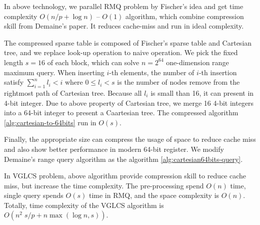 In above technology, we parallel RMQ problem by Fischer's idea and get
time complexity $O(n / p + \log n)$ -- $O(1)$ algorithm, which combine
compression skill from Demaine's paper. It reduces cache-miss and run in
ideal complexity.

\iffalse
在上述的技術中，我們可以藉由 Fischer 提出的方案平行化 RMQ 至 $O(n / p + \log n)$ -- $O(1)$，使用 Demaine 提供的技巧壓縮空間使用量，降低快取未中以提升運行效能。這裡我們挑選固定長度的壓縮方案 $s = 16$，其能解決序列長度為 $n = 2^{64}$ 的區間查找，將 16 個整數壓縮成一棵笛卡爾樹。在第 $i$ 次插入時，左旋的次數 $l_i$，每次操作皆符合 $\sum_{i=1}^{n} l_i < i$。
\fi

The compressed sparse table is composed of Fischer's sparse table and
Cartesian tree, and we replace look-up operation to naive operation.  We
pick the fixed length $s = 16$ of each block, which can solve $n =
2^{64}$ one-dimension range maximum query.  When inserting $i$-th
elements, the number of $i$-th insertion satisfy $\sum_{i=1}^{n} l_i <
i$ where $0 \le l_i < s$ is the number of nodes remove from the
rightmost path of Cartesian tree.  Because all $l_i$ is small than 16,
it can present in 4-bit integer.  Due to above property of Cartesian
tree, we merge 16 4-bit integers into a 64-bit integer to present a
Caartesian tree. The compressed algorithm \ref{alg:cartesian-to-64bits}
run in $O(s)$.




Finally, the appropriate size can compress the usage of space to
reduce cache miss and also show better performance in modern 64-bit
register.  We modify Demaine's range query algorithm as the algorithm
\ref{alg:cartesian64bits-query}.



\iffalse
因所有 $l_i < 16$，使得每個 $l_i$ 可用 4-bit 表示之，
整體便可用 64-bit 長整數表示一棵笛卡爾樹的狀態。
為了現在常見的 64-byte 快取列 (cache line) 和 64-bit 暫存器 (register) 考量，
我們選用合適的大小進行測試，不僅壓縮空間使用量，同時也減少快取未中的問題。
最後，我們得到壓縮算法 \ref{alg:cartesian-to-64bits}，其相對應的區間查找算法，
根據 Demaine \cite{demaine} 進行修改，得到壓縮下的詢問算法 \ref{alg:cartesian64bits-query}。
\fi

In VGLCS problem, above algorithm provide compression skill to reduce
cache miss, but increase the time complexity.  The pre-processing spend
$O(n)$ time, single query spends $O(s)$ time in RMQ, and the space
complexity is  $O(n)$.  Totally, time complexity of the VGLCS algorithm
is $O(n^2 \; s / p + n \max(\log n, s))$.

\iffalse
回到 VGLCS 的應用中，上述算法使用壓縮方式降低快取未中。
我們可以使用上述的算法取代原先的并查集，建表的時間複雜度為 $O(n)$，
單一查詢的時間複雜度為 $O(s)$。
整體的時間複雜度為 $O(n^2 \; s / p + n \max(\log n, s))$。
\fi
